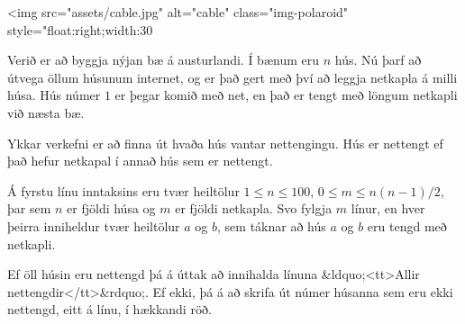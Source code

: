 
<img src="assets/cable.jpg" alt="cable" class="img-polaroid" style="float:right;width:30%

Verið er að byggja nýjan bæ á austurlandi. Í bænum eru $n$ hús. Nú þarf að
útvega öllum húsunum internet, og er það gert með því að leggja netkapla á
milli húsa. Hús númer $1$ er þegar komið með net, en það er tengt með löngum
netkapli við næsta bæ.

Ykkar verkefni er að finna út hvaða hús vantar nettengingu. Hús er nettengt
ef það hefur netkapal í annað hús sem er nettengt.

Á fyrstu línu inntaksins eru tvær heiltölur $1 \leq n \leq 100$, $0 \leq m \leq
n(n-1)/2$, þar sem $n$ er fjöldi húsa og $m$ er fjöldi netkapla. Svo fylgja $m$
línur, en hver þeirra inniheldur tvær heiltölur $a$ og $b$, sem táknar að hús
$a$ og $b$ eru tengd með netkapli.

Ef öll húsin eru nettengd þá á úttak að innihalda línuna &ldquo;<tt>Allir
nettengdir</tt>&rdquo;. Ef ekki, þá á að skrifa út númer húsanna sem eru ekki
nettengd, eitt á línu, í hækkandi röð.

